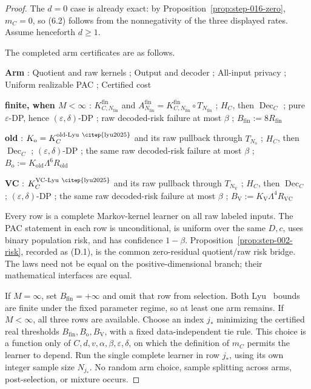 \begin{proof}
The \(d=0\) case is already exact: by
Proposition~\ref{prop:step-016-zero}, \(m_C=0\), so (6.2) follows from the
nonnegativity of the three displayed rates. Assume henceforth \(d\ge1\).

The completed arm certificates are as follows.

\noindent\textbf{ Arm }:  Quotient and raw kernels ;  Output and decoder ;  All-input privacy ;  Uniform realizable PAC ;  Certified cost \par
\noindent\textbf{ finite, when \(M<\infty\) }:  \(K^{\mathrm{fin}}_{C,N_{\mathrm{fin}}}\) and \(A^{\mathrm{fin}}_{N_{\mathrm{fin}}}=K^{\mathrm{fin}}_{C,N_{\mathrm{fin}}}\circ T_{N_{\mathrm{fin}}}\) ;  \(H_C\), then \(\operatorname{Dec}_C\) ;  pure \(\varepsilon\)-DP, hence \((\varepsilon,\delta)\)-DP ;  raw decoded-risk failure at most \(\beta\) ;  \(B_{\mathrm{fin}}:=8R_{\mathrm{fin}}\) \par
\noindent\textbf{ old }:   \(K_{\mathrm o}=K_C^{\mathrm{old\text{-}Lyu~\citep{lyu2025}}}\) and its raw pullback through \(T_{N_{\mathrm o}}\) ;  \(H_C\), then \(\operatorname{Dec}_C\) ;  \((\varepsilon,\delta)\)-DP ;  the same raw decoded-risk failure at most \(\beta\) ;  \(B_{\mathrm o}:=K_{\mathrm{old}}\Lambda^6R_{\mathrm{old}}\) \par
\noindent\textbf{ VC }:   \(K_C^{\mathrm{VC\text{-}Lyu~\citep{lyu2025}}}\) and its raw pullback through \(T_{N_{\mathrm V}}\) ;  \(H_C\), then \(\operatorname{Dec}_C\) ;  \((\varepsilon,\delta)\)-DP ;  the same raw decoded-risk failure at most \(\beta\) ;  \(B_{\mathrm V}:=K_{\mathrm V}\Lambda^4R_{\mathrm{VC}}\) \par

Every row is a complete Markov-kernel learner on all raw labeled inputs. The
PAC statement in each row is unconditional, is uniform over the same
\(D,c\), uses binary population risk, and has confidence \(1-\beta\).
Proposition~\ref{prop:step-002-risk}, recorded as (D.1), is the
common zero-residual quotient/raw risk bridge. The laws need not be equal on
the positive-dimensional branch; their mathematical interfaces are equal.

If \(M=\infty\), set \(B_{\mathrm{fin}}=+\infty\) and omit that row from
selection. Both Lyu~\citep{lyu2025} bounds are finite under the fixed parameter regime, so at
least one arm remains. If \(M<\infty\), all three rows are available. Choose
an index \(j_*\) minimizing the certified real thresholds
\(B_{\mathrm{fin}},B_{\mathrm o},B_{\mathrm V}\), with a fixed
data-independent tie rule. This choice is a function only of
\(C,d,v,\alpha,\beta,\varepsilon,\delta\), on which the definition of
\(m_C\) permits the learner to depend. Run the single complete learner in
row \(j_*\), using its own integer sample size \(N_{j_*}\). No random arm
choice, sample splitting across arms, post-selection, or mixture occurs.


\end{proof}
